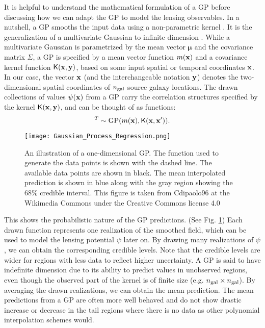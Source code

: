 It is helpful to understand the mathematical formulation of a GP 
before discussing how we can adapt the GP to model the lensing observables. 
In a nutshell, a GP smooths the input data using a non-parametric kernel
\citep{Hastie1990}. 
It is the generalization of a multivariate Gaussian 
to infinite dimension \citep{Rasmussen2006}. 
While a multivariate Gaussian is parametrized by  
the mean vector $\mathbf{\mu}$ and the covariance matrix $\Sigma$, 
a GP is specified by a mean vector function $m(\mathbf{x})$ and a
covariance kernel function $\mathsf{K}(\mathbf{x}, \mathbf{y})$, based on some input spatial or
temporal coordinates $\mathbf{x}$. In our case, the vector $\mathbf{x}$ (and the
interchangeable notation $\mathbf{y}$) denotes the
two-dimensional spatial coordinates of $n_{\rm gal}$ source galaxy locations. 
The drawn collections of values $\psi(\mathbf{x})$ from a GP carry the correlation structures
specified by the kernel $\mathsf{K}(\mathbf{x}, \mathbf{y})$, and can be thought of as
functions: 
\begin{equation}
		[\psi_1(\xv), \psi_2(\xv) \ldots, \psi_m(\xv) ]^T \sim \gp(m(\xv), \kerngp(\xv, \xv')).
		\label{eq:GP}
\end{equation}
\begin{figure}
	\centering
	\texttt{[image: Gaussian\_Process\_Regression.png]}
	\caption{An illustration of a one-dimensional GP. The
		function used to generate the data points 
		is shown with the dashed line. The available data points are shown in
		black. The mean interpolated prediction is shown in blue
		along with the gray region showing the 68\% 
		credible interval. This figure is taken from Cdipaolo96 at 
		the Wikimedia Commons under the Creative Commons license 4.0
\label{fig:one_d_gaussian_process}}
\end{figure}


This shows the probabilistic nature of the GP predictions.
(See Fig. \ref{fig:one_d_gaussian_process})
Each drawn function represents one realization of the smoothed
field, which can be used to model the lensing potential $\psi$ later on. 
By drawing many realizations of $\psi$, we can obtain the
corresponding credible levels.
Note that the credible levels are wider for regions with less data to reflect
higher uncertainty. A GP is said to have indefinite dimension due to its ability to
predict values in unobserved regions, even though the 
observed part of the kernel is of finite size (e.g. $n_{\rm gal} \times n_{\rm gal}$). 
By averaging the drawn realizations, we can
obtain the mean prediction. The mean predictions from a GP are
often more well behaved and do not show drastic increase or decrease 
in the tail regions where there is no data as other polynomial interpolation schemes 
would.  

